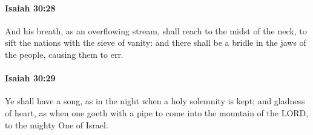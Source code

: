 		\paragraph{Isaiah 30:28} %
			\label{ISAIAH-30-28}

			And his breath, as an overflowing stream, shall reach to the midst of the neck, to sift the nations with the sieve of vanity: and there shall be a bridle in the jaws of the people, causing them to err.


		\paragraph{Isaiah 30:29} %
			\label{ISAIAH-30-29}

			Ye shall have a song, as in the night when a holy solemnity is kept; and gladness of heart, as when one goeth with a pipe to come into the mountain of the LORD, to the mighty One of Israel.

